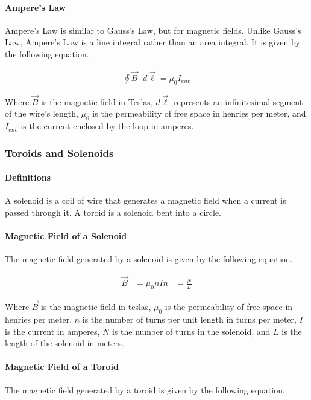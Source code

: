 \paragraph*{Ampere's Law}
Ampere's Law is similar to Gauss's Law, but for magnetic fields. Unlike Gauss's Law, Ampere's Law is a line integral rather than an area integral. 
It is given by the following equation.

\begin{align*}
    \oint \vec{B} \cdot d\vec{\ell} = \mu_0 I_{enc}
\end{align*}

Where $\vec{B}$ is the magnetic field in Teslas, $d\vec{\ell}$ represents an infinitesimal segment of the wire's length, $\mu_0$ is the 
permeability of free space in henries per meter, and $I_{enc}$ is the current enclosed by the loop in amperes.\\

\subsubsection*{Toroids and Solenoids}
\paragraph*{Definitions}
A solenoid is a coil of wire that generates a magnetic field when a current is passed through it. A toroid is a solenoid bent into a circle. 

\paragraph*{Magnetic Field of a Solenoid}
The magnetic field generated by a solenoid is given by the following equation.

\begin{align*}
    \vec{B} &= \mu_0 nI
    n &= \frac{N}{L}
\end{align*}

Where $\vec{B}$ is the magnetic field in teslas, $\mu_0$ is the permeability of free space in henries per meter, $n$ is the number of turns per
unit length in turns per meter, $I$ is the current in amperes, $N$ is the number of turns in the solenoid, and $L$ is the length of the solenoid in meters.\\

\paragraph*{Magnetic Field of a Toroid}
The magnetic field generated by a toroid is given by the following equation.

